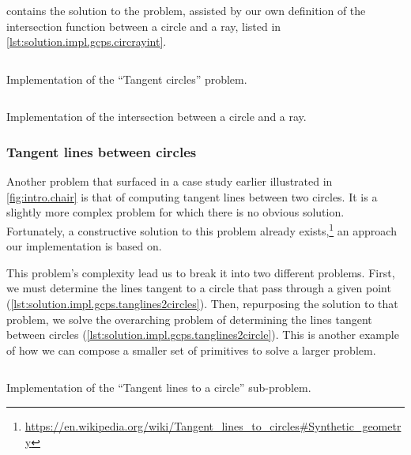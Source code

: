  contains the solution to the
problem, assisted by our own definition of the intersection function between a
circle and a ray, listed in \cref{lst:solution.impl.gcps.circrayint}.

\begin{listing}[htb]
  \inputminted[firstline=11]{julia}{jl/tangent_circles.jl}
  \caption[Tangent circles]{
    Implementation of the ``Tangent circles'' problem.}%
  \label{lst:solution.impl.gcps.tangentcircles}
\end{listing}

\begin{listing}
  \inputminted[lastline=9]{julia}{jl/tangent_circles.jl}
  \caption[Circle-Ray intersection]{
    Implementation of the intersection between a circle and a ray.}%
  \label{lst:solution.impl.gcps.circrayint}
\end{listing}

\subsubsection{Tangent lines between circles}%
\label{sec:solution.impl.gcps.tanglines2circles}

Another problem that surfaced in a case study earlier illustrated in
\cref{fig:intro.chair} is that of computing tangent lines between two circles.
It is a slightly more complex problem for which there is no obvious solution.
Fortunately, a constructive solution to this problem already
exists,\footnote{\url{https://en.wikipedia.org/wiki/Tangent_lines_to_circles\#Synthetic_geometry}}
an approach our implementation is based on.

This problem's complexity lead us to break it into two different problems.
First, we must determine the lines tangent to a circle that pass through a given
point (\cref{lst:solution.impl.gcps.tanglines2circles}).  Then, repurposing the
solution to that problem, we solve the overarching problem of determining the
lines tangent between circles (\cref{lst:solution.impl.gcps.tanglines2circle}).
This is another example of how we can compose a smaller set of primitives to
solve a larger problem.

\begin{listing}[htbp]
  \inputminted[firstline=2,lastline=16]{julia}{jl/circ_tangent_lines.jl}
  \caption[Tangent lines to a circle]{
    Implementation of the ``Tangent lines to a circle'' sub-problem.}%
  \label{lst:solution.impl.gcps.tanglines2circles}
\end{listing}

